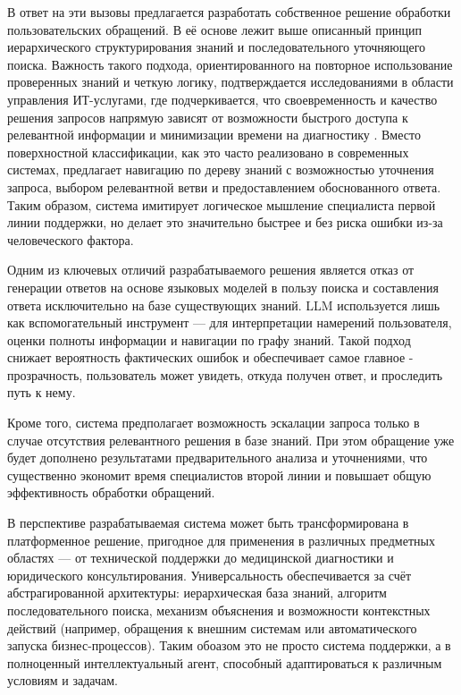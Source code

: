 В ответ на эти вызовы предлагается разработать собственное решение обработки пользовательских обращений. В её основе лежит выше описанный принцип иерархического структурирования знаний и последовательного уточняющего поиска. Важность такого подхода, ориентированного на повторное использование проверенных знаний и четкую логику, подтверждается исследованиями в области управления ИТ-услугами, где подчеркивается, что своевременность и качество решения запросов напрямую зависят от возможности быстрого доступа к релевантной информации и минимизации времени на диагностику \cite{cleverics}. Вместо поверхностной классификации, как это часто реализовано в современных системах, предлагает навигацию по дереву знаний с возможностью уточнения запроса, выбором релевантной ветви и предоставлением обоснованного ответа. Таким образом, система имитирует логическое мышление специалиста первой линии поддержки, но делает это значительно быстрее и без риска ошибки из-за человеческого фактора.

Одним из ключевых отличий разрабатываемого решения является отказ от генерации ответов на основе языковых моделей в пользу поиска и составления ответа исключительно на базе существующих знаний. LLM используется лишь как вспомогательный инструмент — для интерпретации намерений пользователя, оценки полноты информации и навигации по графу знаний. Такой подход снижает вероятность фактических ошибок и обеспечивает самое главное - прозрачность, пользователь может увидеть, откуда получен ответ, и проследить путь к нему.

Кроме того, система предполагает возможность эскалации запроса только в случае отсутствия релевантного решения в базе знаний. При этом обращение уже будет дополнено результатами предварительного анализа и уточнениями, что существенно экономит время специалистов второй линии и повышает общую эффективность обработки обращений.

В перспективе разрабатываемая система может быть трансформирована в платформенное решение, пригодное для применения в различных предметных областях — от технической поддержки до медицинской диагностики и юридического консультирования. Универсальность обеспечивается за счёт абстрагированной архитектуры: иерархическая база знаний, алгоритм последовательного поиска, механизм объяснения и возможности контекстных действий (например, обращения к внешним системам или автоматического запуска бизнес-процессов). Таким обоазом это не просто система поддержки, а в полноценный интеллектуальный агент, способный адаптироваться к различным условиям и задачам.

